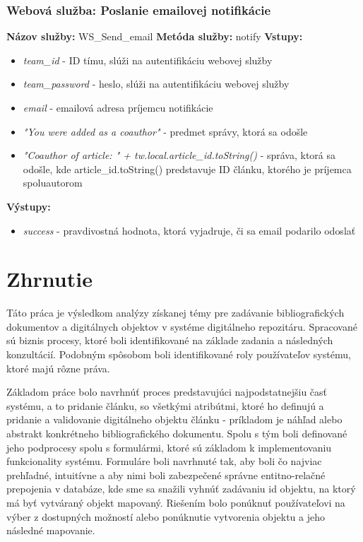 \documentclass[10pt,oneside,slovak,a4paper]{article}
\begin{document}
\subsubsection{Webová služba: Poslanie emailovej notifikácie}
\textbf{Názov služby:} WS\_Send\_email
\textbf{Metóda služby:} notify
\textbf{Vstupy:}
	\begin{itemize}
		\item \textit{team\_id} - ID tímu, slúži na autentifikáciu webovej služby
		\item \textit{team\_password} - heslo, slúži na autentifikáciu webovej služby
		\item \textit{email} - emailová adresa príjemcu notifikácie
		\item \textit{"You were added as a coauthor"} - predmet správy, ktorá sa odošle
		\item \textit{"Coauthor of article: " + tw.local.article\_id.toString()} - správa, ktorá sa odošle, kde article\_id.toString() predstavuje ID článku, ktorého je príjemca spoluautorom
	\end{itemize}
\textbf{Výstupy:}
	\begin{itemize}
		\item \textit{success} - pravdivostná hodnota, ktorá vyjadruje, či sa email podarilo odoslať
	\end{itemize}

\newpage

\section{Zhrnutie}
Táto práca je výsledkom analýzy získanej témy pre zadávanie bibliografických dokumentov a digitálnych objektov v systéme digitálneho repozitáru. Spracované sú biznis procesy, ktoré boli identifikované na základe zadania a následných konzultácií. Podobným spôsobom boli identifikované roly používateľov systému, ktoré majú rôzne práva. 

Základom práce bolo navrhnúť proces predstavujúci najpodstatnejšiu časť systému, a to pridanie článku, so všetkými atribútmi, ktoré ho definujú a pridanie a validovanie digitálneho objektu článku - príkladom je náhľad alebo abstrakt konkrétneho bibliografického dokumentu. Spolu s tým boli definované jeho podprocesy spolu s formulármi, ktoré sú základom k implementovaniu funkcionality systému. Formuláre boli navrhnuté tak, aby boli čo najviac prehľadné, intuitívne a aby nimi boli zabezpečené správne entitno-relačné prepojenia v databáze, kde sme sa snažili vyhnúť zadávaniu id objektu, na ktorý má byť vytváraný objekt mapovaný. Riešením bolo ponúknuť používateľovi na výber z dostupných možností alebo ponúknutie vytvorenia objektu a jeho následné mapovanie.
\end{document}
